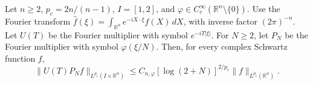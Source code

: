 Let \(n\ge2\), \(p_c=2n/(n-1)\), \(I=[1,2]\), and
\(\varphi\in C_c^\infty(\mathbb R^n\setminus\{0\})\). Use the Fourier transform
\(\widehat f(\xi)=\int_{\mathbb R^n}e^{-iX\cdot\xi}f(X)\,dX\), with
inverse factor \((2\pi)^{-n}\). Let \(U(T)\) be the Fourier multiplier
with symbol \(e^{-iT|\xi|}\). For \(N\ge2\), let \(P_N\) be the
Fourier multiplier with symbol \(\varphi(\xi/N)\). Then, for every
complex Schwartz function \(f\),
\[
 \|U(T)P_N f\|_{L^{p_c}(I\times\mathbb R^n)}
 \le C_{n,\varphi}[\log(2+N)]^{2/p_c}\|f\|_{L^{p_c}(\mathbb R^n)}.
\]
